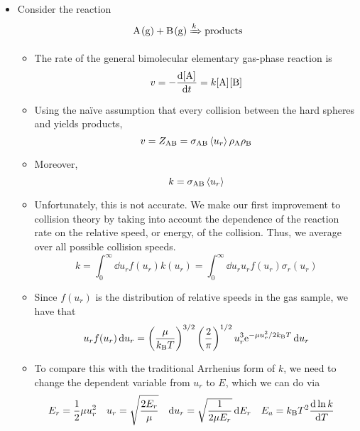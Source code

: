 \documentclass[../notes.tex]{subfiles}
\begin{document}
\begin{itemize}
\begin{equation*}
    \end{equation*}
    \item Consider the reaction
    \begin{equation*}
        \ce{A(g) + B(g)} \xRightarrow{k} \ce{products}
    \end{equation*}
    \begin{itemize}
        \item The rate of the general bimolecular elementary gas-phase reaction is
        \begin{equation*}
            v = -\dv{\cnc{A}}{t} = k\cnc{A}\cnc{B}
        \end{equation*}
        \item Using the na\"{i}ve assumption that every collision between the hard spheres  and  yields products,
        \begin{equation*}
            v = Z_{\ce{A}\ce{B}} = \sigma_{\ce{A}\ce{B}}\prb{u_r}\rho_{\ce{A}}\rho_{\ce{B}}
        \end{equation*}
        \item Moreover,
        \begin{equation*}
            k = \sigma_{\ce{A}\ce{B}}\prb{u_r}
        \end{equation*}
        \item Unfortunately, this is not accurate. We make our first improvement to collision theory by taking into account the dependence of the reaction rate on the relative speed, or energy, of the collision. Thus, we average over all possible collision speeds.
        \begin{equation*}
            k = \int_0^\infty\dd{u_r}f(u_r)k(u_r)
            = \int_0^\infty\dd{u_r}u_rf(u_r)\sigma_r(u_r)
        \end{equation*}
        \item Since $f(u_r)$ is the distribution of relative speeds in the gas sample, we have that
        \begin{equation*}
            u_rf(u_r)\dd{u_r} = \left( \frac{\mu}{\kB T} \right)^{3/2}\left( \frac{2}{\pi} \right)^{1/2}u_r^3\e[-\mu u_r^2/2\kB T]\dd{u_r}
        \end{equation*}
        \item To compare this with the traditional Arrhenius form of $k$, we need to change the dependent variable from $u_r$ to $E$, which we can do via
        \begin{align*}
            E_r &= \frac{1}{2}\mu u_r^2&
            u_r &= \sqrt{\frac{2E_r}{\mu}}&
            \dd{u_r} &= \sqrt{\frac{1}{2\mu E_r}}\dd{E_r}&
            E_a &= \kB T^2\dv{\ln k}{T}
        \end{align*}
    \end{itemize}
\end{itemize}
\end{document}
